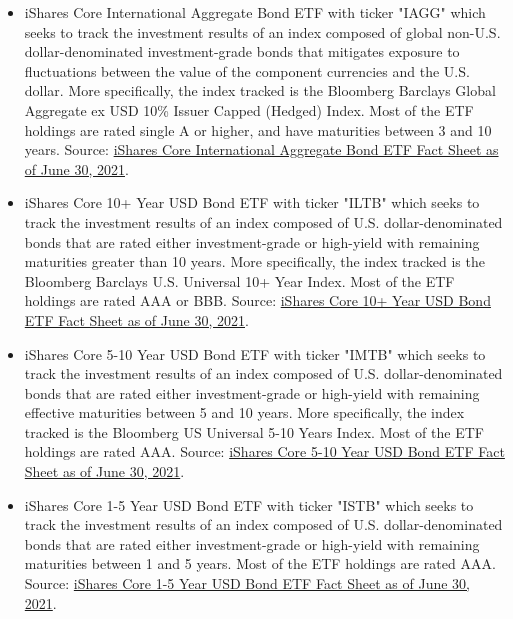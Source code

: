 \begin{itemize}
    \item iShares Core International Aggregate Bond ETF with ticker "IAGG" which seeks to track the investment results of an index composed of global non-U.S. dollar-denominated investment-grade bonds that mitigates exposure to fluctuations between the value of the component currencies and the U.S. dollar. More specifically, the index tracked is the Bloomberg Barclays Global Aggregate ex USD 10\% Issuer Capped (Hedged) Index. Most of the ETF holdings are rated single A or higher, and have maturities between 3 and 10 years. Source: \href{https://www.ishares.com/us/literature/fact-sheet/iagg-ishares-core-international-aggregate-bond-etf-fund-fact-sheet-en-us.pdf}{iShares Core International Aggregate Bond ETF Fact Sheet as of June 30, 2021}.%
    
    \item iShares Core 10+ Year USD Bond ETF with ticker "ILTB" which seeks to track the investment results of an index composed of U.S. dollar-denominated bonds that are rated either investment-grade or high-yield with remaining maturities greater than 10 years. More specifically, the index tracked is the Bloomberg Barclays U.S. Universal 10+ Year Index. Most of the ETF holdings are rated AAA or BBB. Source: \href{https://www.ishares.com/us/literature/fact-sheet/iltb-ishares-core-10-year-usd-bond-etf-fund-fact-sheet-en-us.pdf}{iShares Core 10+ Year USD Bond ETF Fact Sheet as of June 30, 2021}.%
    
    \item iShares Core 5-10 Year USD Bond ETF with ticker "IMTB" which seeks to track the investment results of an index composed of U.S. dollar-denominated bonds that are rated either investment-grade or high-yield with remaining effective maturities between 5 and 10 years. More specifically, the index tracked is the Bloomberg US Universal 5-10 Years Index. Most of the ETF holdings are rated AAA. Source: \href{https://www.ishares.com/us/literature/fact-sheet/imtb-ishares-core-5-10-year-usd-bond-etf-fund-fact-sheet-en-us.pdf}{iShares Core 5-10 Year USD Bond ETF Fact Sheet as of June 30, 2021}.%
    
    \item iShares Core 1-5 Year USD Bond ETF with ticker "ISTB" which seeks to track the investment results of an index composed of U.S. dollar-denominated bonds that are rated either investment-grade or high-yield with remaining maturities between 1 and 5 years. Most of the ETF holdings are rated AAA. Source: \href{https://www.ishares.com/us/literature/fact-sheet/istb-ishares-core-1-5-year-usd-bond-etf-fund-fact-sheet-en-us.pdf}{iShares Core 1-5 Year USD Bond ETF Fact Sheet as of June 30, 2021}.%
\end{itemize}

